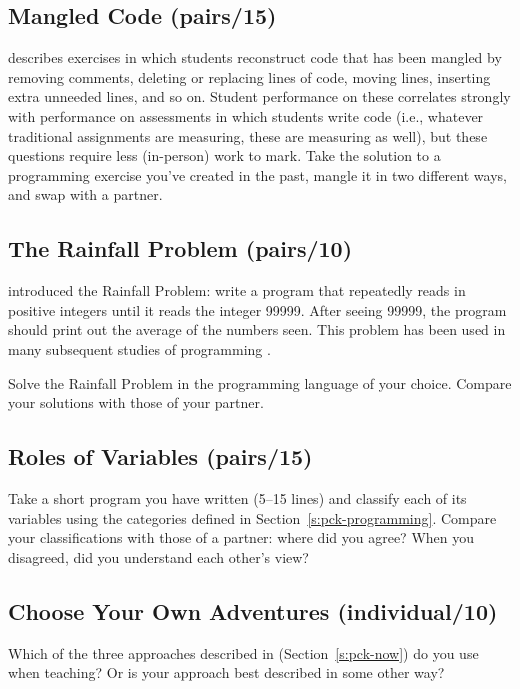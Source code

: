\subsection*{Mangled Code (pairs/15)}

\cite{Chen2017} describes exercises in which students reconstruct
code that has been mangled by removing comments, deleting or replacing
lines of code, moving lines, inserting extra unneeded lines, and so on.
Student performance on these correlates strongly with performance on
assessments in which students write code (i.e., whatever traditional
assignments are measuring, these are measuring as well), but these
questions require less (in-person) work to mark. Take the solution to a
programming exercise you've created in the past, mangle it in two
different ways, and swap with a partner.

\subsection*{The Rainfall Problem (pairs/10)}

\cite{Solo1986} introduced the Rainfall Problem: write a program that
repeatedly reads in positive integers until it reads the integer 99999.
After seeing 99999, the program should print out the average of the
numbers seen. This problem has been used in many subsequent studies of
programming \cite{Fisl2014,Simo2013,Sepp2015}.

Solve the Rainfall Problem in the programming language of your choice.
Compare your solutions with those of your partner.

\subsection*{Roles of Variables (pairs/15)}

Take a short program you have written (5--15 lines) and classify each of
its variables using the categories defined in
Section~\ref{s:pck-programming}. Compare your classifications with those
of a partner: where did you agree? When you disagreed, did you
understand each other's view?

\subsection*{Choose Your Own Adventures (individual/10)}

Which of the three approaches described in \cite{Sorv2014}
(Section~\ref{s:pck-now}) do you use when teaching? Or is your approach
best described in some other way?

